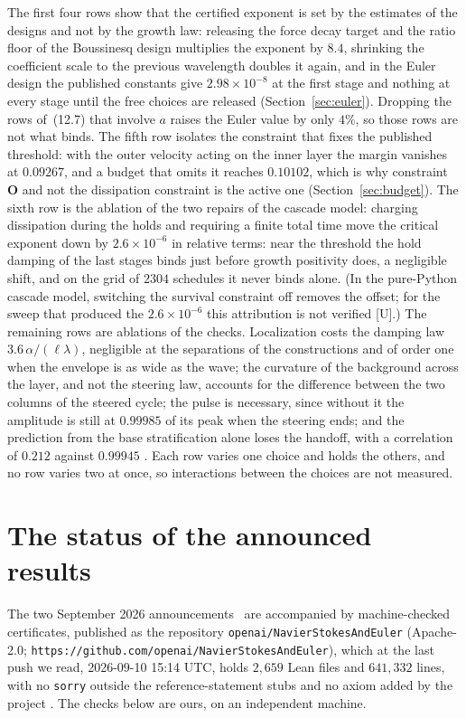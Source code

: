 \documentclass[11pt]{article}
\theoremstyle{remark}
\newcommand{\ev}[1]{\hspace{0.2em}{\small\textsf{[#1]}}}
\newcommand{\fp}[1]{\nolinkurl{#1}}
\begin{document}
The first four rows show that the certified exponent is set by the estimates of the designs and not by the growth law:
releasing the force decay target and the ratio floor of the Boussinesq design multiplies the exponent by $8.4$, shrinking
the coefficient scale to the previous wavelength doubles it again, and in the Euler design the published constants give
$2.98\times10^{-8}$ at the first stage and nothing at every stage until the free choices are released
(Section~\ref{sec:euler}). Dropping the rows of~(12.7) that involve $a$ raises the Euler value by only $4\%$, so those rows
are not what binds. The fifth row isolates the constraint that fixes the published threshold: with the outer velocity
acting on the inner layer the margin vanishes at $0.09267$, and a budget that omits it reaches $0.10102$, which is why
constraint \textbf{O} and not the dissipation constraint is the active one (Section~\ref{sec:budget}). The sixth row is the
ablation of the two repairs of the cascade model: charging dissipation during the holds and requiring a finite total time move the critical exponent
down by $2.6\times10^{-6}$ in relative terms: near the threshold the hold damping of the last stages binds just before
growth positivity does, a negligible shift, and on the grid of $2304$ schedules it never binds alone. (In the
pure-Python cascade model, switching the survival constraint off removes the offset; for the sweep that produced the
$2.6\times10^{-6}$ this attribution is not verified [U].) The remaining rows
are ablations of the checks. Localization costs the damping law $3.6\,\alpha/(\ell\lambda)$, negligible at the separations
of the constructions and of order one when the envelope is as wide as the wave; the curvature of the background across the
layer, and not the steering law, accounts for the difference between the two columns of the steered cycle; the pulse is
necessary, since without it the amplitude is still at $0.99985$ of its peak when the steering ends; and the prediction
from the base stratification alone loses the handoff, with a correlation of $0.212$ against $0.99945$ \ev{MV}. Each row
varies one choice and holds the others, and no row varies two at once, so interactions between the choices are not measured.

\section{The status of the announced results}\label{sec:status}

The two September 2026 announcements~\cite{openai-ns,openai-euler} are accompanied by
machine-checked certificates, published as the repository \fp{openai/NavierStokesAndEuler}
(Apache-2.0; \fp{https://github.com/openai/NavierStokesAndEuler}), which at the last push we read,
2026-09-10 15:14 UTC, holds $2{,}659$ Lean files and $641{,}332$ lines, with no \fp{sorry}
outside the reference-statement stubs and no axiom added by the project \ev{V}. The checks below are
ours, on an independent machine.
\end{document}
